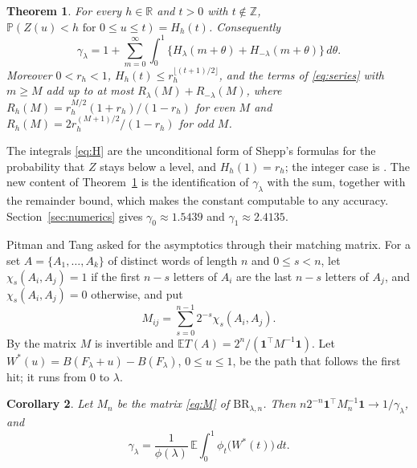 \documentclass[11pt]{amsart}
\newtheorem{theorem}{Theorem}[section]
\newtheorem{corollary}[theorem]{Corollary}
\theoremstyle{remark}
\numberwithin{equation}{section}
\newcommand{\PP}{\mathbb{P}}
\newcommand{\EE}{\mathbb{E}}
\newcommand{\Z}{\mathbb{Z}}
\newcommand{\R}{\mathbb{R}}
\newcommand{\BR}{\mathrm{BR}}
\newcommand{\one}{\mathbf 1}
\begin{document}
\begin{theorem}\label{thm:series}
For every $h\in\R$ and $t>0$ with $t\notin\Z$, $\PP(Z(u)<h\text{ for }0\le u\le t)=H_h(t)$. Consequently
\begin{equation}\label{eq:series}
\gamma_\lambda=1+\sum_{m=0}^\infty\int_0^1\bigl\{H_\lambda(m+\theta)+H_{-\lambda}(m+\theta)\bigr\}\,d\theta .
\end{equation}
Moreover $0<r_h<1$, $H_h(t)\le r_h^{\lfloor(t+1)/2\rfloor}$, and the terms of \eqref{eq:series} with $m\ge M$ add up to at most $R_\lambda(M)+R_{-\lambda}(M)$, where $R_h(M)=r_h^{M/2}(1+r_h)/(1-r_h)$ for even $M$ and $R_h(M)=2r_h^{(M+1)/2}/(1-r_h)$ for odd $M$.
\end{theorem}

The integrals \eqref{eq:H} are the unconditional form of Shepp's formulas \cite[(2.25)--(2.26)]{Shepp} for the probability that $Z$ stays below a level, and $H_h(1)=r_h$; the integer case is \cite[(2.15)--(2.16)]{Shepp}. The new content of Theorem~\ref{thm:series} is the identification of $\gamma_\lambda$ with the sum, together with the remainder bound, which makes the constant computable to any accuracy. Section~\ref{sec:numerics} gives $\gamma_0\approx1.5439$ and $\gamma_1\approx2.4135$.

Pitman and Tang asked for the asymptotics through their matching matrix. For a set $A=\{A_1,\dots,A_k\}$ of distinct words of length $n$ and $0\le s<n$, let $\chi_s(A_i,A_j)=1$ if the first $n-s$ letters of $A_i$ are the last $n-s$ letters of $A_j$, and $\chi_s(A_i,A_j)=0$ otherwise, and put
\begin{equation}\label{eq:M}
M_{ij}=\sum_{s=0}^{n-1}2^{-s}\chi_s(A_i,A_j).
\end{equation}
By \cite[Theorem~2.1]{PT} the matrix $M$ is invertible and $\EE T(A)=2^n/(\one^\top M^{-1}\one)$. Let $W^*(u)=B(F_\lambda+u)-B(F_\lambda)$, $0\le u\le1$, be the path that follows the first hit; it runs from $0$ to $\lambda$.

\begin{corollary}\label{cor:matching}
Let $M_n$ be the matrix \eqref{eq:M} of $\BR_{\lambda,n}$. Then $n2^{-n}\one^\top M_n^{-1}\one\to1/\gamma_\lambda$, and
\begin{equation}\label{eq:weights}
\gamma_\lambda=\frac1{\phi(\lambda)}\,\EE\int_0^1\phi_t\bigl(W^*(t)\bigr)\,dt .
\end{equation}
\end{corollary}
\end{document}
